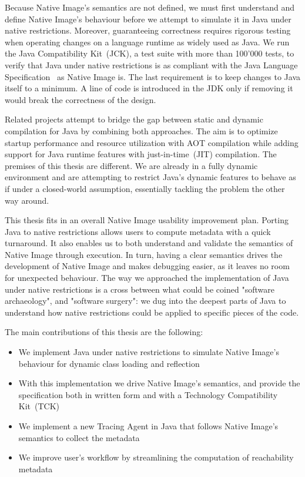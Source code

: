Because Native Image's semantics are not defined, we must first understand and define Native Image's behaviour before we attempt to simulate it in Java under native restrictions. Moreover, guaranteeing correctness requires rigorous testing when operating changes on a language runtime as widely used as Java. We run the Java Compatibility Kit~(JCK), a test suite with more than 100'000 tests, to verify that Java under native restrictions is as compliant with the Java Language Specification~\cite{noauthor_java_nodate-2} as Native Image is.
The last requirement is to keep changes to Java itself to a minimum. A line of code is introduced in the JDK only if removing it would break the correctness of the design.

Related projects attempt to bridge the gap between static and dynamic compilation for Java by combining both approaches. The aim is to optimize startup performance and resource utilization with AOT compilation while adding support for Java runtime features with just-in-time~(JIT) compilation. The premises of this thesis are different. We are already in a fully dynamic environment and are attempting to restrict Java's dynamic features to behave as if under a closed-world assumption, essentially tackling the problem the other way around. 

This thesis fits in an overall Native Image usability improvement plan. Porting Java to native restrictions allows users to compute metadata with a quick turnaround. It also enables us to both understand and validate the semantics of Native Image through execution. In turn, having a clear semantics drives the development of Native Image and makes debugging easier, as it leaves no room for unexpected behaviour.
The way we approached the implementation of Java under native restrictions is a cross between what could be coined "software archaeology", and "software surgery": we dug into the deepest parts of Java to understand how native restrictions could be applied to specific pieces of the code.

The main contributions of this thesis are the following:
\begin{itemize}
  \item We implement Java under native restrictions to simulate Native Image's behaviour for dynamic class loading and reflection
  \item With this implementation we drive Native Image's semantics, and provide the specification both in written form and with a Technology Compatibility Kit~(TCK) 
  \item We implement a new Tracing Agent in Java that follows Native Image's semantics to collect the metadata 
  \item We improve user's workflow by streamlining the computation of reachability metadata
\end{itemize}